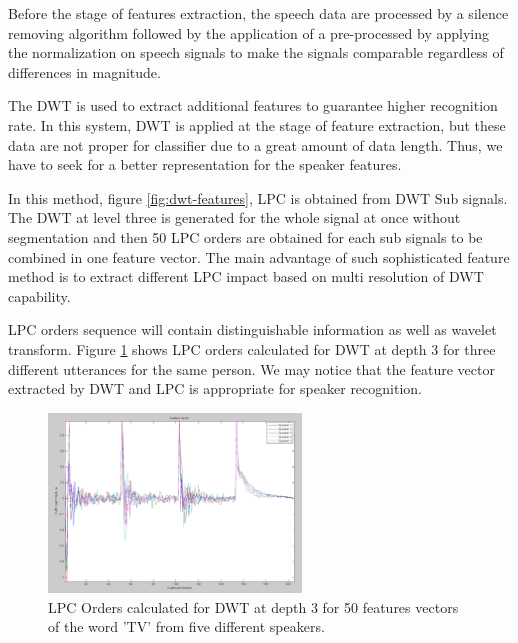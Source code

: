 \documentclass[12pt, a4paper, twoside]{report}
\begin{document}
Before the stage of features extraction, the speech data are processed by a silence removing algorithm followed by the application of a pre-processed by applying the normalization on speech signals to make the signals comparable regardless of differences in magnitude.
\par
The DWT is used to extract additional features to guarantee higher recognition rate. In this system, DWT is applied at the stage of feature extraction, but these data are not proper for classifier due to a great amount of data length. Thus, we have to seek for a better representation for the speaker features.
\par
In this method, figure \ref{fig:dwt-features}, LPC is obtained from DWT Sub signals. The DWT at level three is generated for the whole signal at once without segmentation and then 50 LPC orders are obtained for each sub signals to be combined in one feature vector. The main advantage of such sophisticated feature method is to extract different LPC impact based on multi resolution of DWT capability.
\par
LPC orders sequence will contain distinguishable information as well as wavelet transform. Figure \ref{fig:dwt-lpc-orders} shows LPC orders calculated for DWT at depth 3 for three different utterances for the same person. We may notice that the feature vector extracted by DWT and LPC is appropriate for speaker recognition.
\begin{figure}[!h]
	\centering
	\includegraphics[width=0.6\textwidth]
	{images/chapter5/dwt-lpc-orders}
	\caption{LPC Orders calculated for DWT at depth 3 for 50 features vectors of the word 'TV' from five different speakers.}
	\label{fig:dwt-lpc-orders}
\end{figure}
\end{document}
